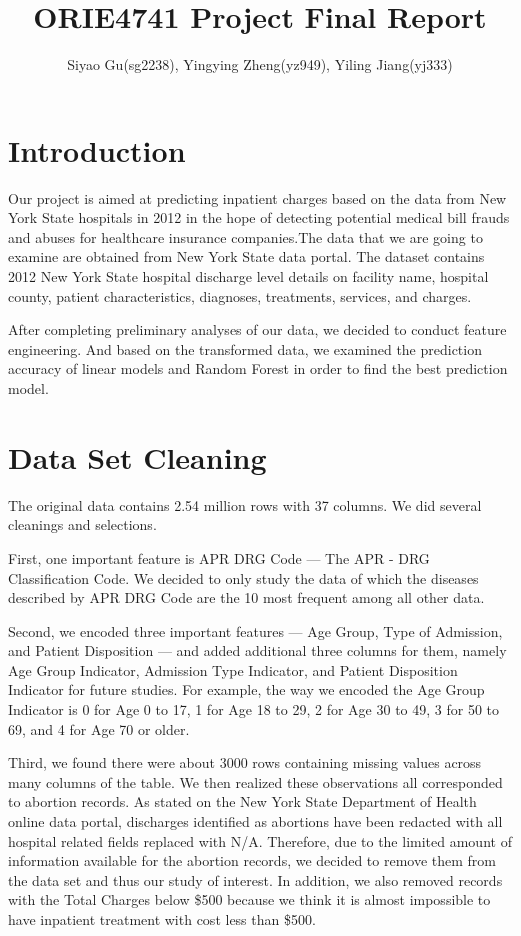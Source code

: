 \documentclass[journal, a4paper,11pt]{IEEEtran}
\begin{document}
	\title{ORIE4741 Project Final Report}
	\author{Siyao Gu(sg2238), Yingying Zheng(yz949), Yiling Jiang(yj333)}
	\maketitle
\section{Introduction}
	Our project is aimed at predicting inpatient charges based on the data from New York State hospitals in 2012 in the hope of detecting potential medical bill frauds and abuses for healthcare insurance companies.The data that we are going to examine are obtained from New York State data portal. The dataset contains 2012 New York State hospital discharge level details on facility name, hospital county, patient characteristics, diagnoses, treatments, services, and charges. 
	
	After completing preliminary analyses of our data, we decided to conduct feature engineering. And based on the transformed data, we examined the prediction accuracy of linear models and Random Forest in order to find the best prediction model.

\section{Data Set Cleaning}
	The original data contains 2.54 million rows with 37 columns. We did several cleanings and selections.

	First, one important feature is APR DRG Code --- The APR - DRG Classification Code. We decided to only study the data of which the diseases described by APR DRG Code are the 10 most frequent among all other data.

	Second, we encoded three important features --- Age Group, Type of Admission, and Patient Disposition --- and added additional three columns for them, namely Age Group Indicator, Admission Type Indicator, and Patient Disposition Indicator for future studies. For example, the way we encoded the Age Group Indicator is 0 for Age 0 to 17, 1 for Age 18 to 29, 2 for Age 30 to 49, 3 for 50 to 69, and 4 for Age 70 or older.
    
	Third, we found there were about 3000 rows containing missing values across many columns of the table. We then realized these observations all corresponded to abortion records. As stated on the New York State Department of Health online data portal, discharges identified as abortions have been redacted with all hospital related fields replaced with N/A. Therefore, due to the limited amount of information available for the abortion records, we decided to remove them from the data set and thus our study of interest. In addition, we also removed records with the Total Charges below \$500 because we think it is almost impossible to have inpatient treatment with cost less than \$500.
\end{document}
